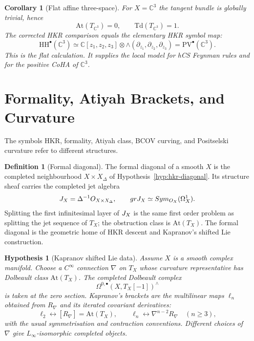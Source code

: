 \documentclass[11pt]{amsart}
\newtheorem{corollary}[theorem]{Corollary}
\newtheorem{hypothesis}[theorem]{Hypothesis}
\theoremstyle{definition}
\newtheorem{definition}[theorem]{Definition}
\theoremstyle{remark}
\providecommand{\At}{\mathrm{At}}
\providecommand{\HH}{\mathrm{HH}}
\providecommand{\PV}{\mathrm{PV}}
\providecommand{\Sym}{\mathrm{Sym}}
\providecommand{\Td}{\mathrm{Td}}
\providecommand{\cO}{\mathcal O}
\providecommand{\C}{\mathbb C}
\begin{document}
\begin{corollary}[Flat affine three-space]
\label{cor:c3-hkr}
For $X=\C^3$ the tangent bundle is globally trivial, hence
\[
  \At(T_{\C^3})=0,\qquad \Td(T_{\C^3})=1.
\]
The corrected HKR comparison equals the elementary HKR symbol map:
\[
  \HH^\bullet(\C^3)\simeq
  \C[z_1,z_2,z_3]\otimes
  \wedge(\partial_{z_1},\partial_{z_2},\partial_{z_3})
  =\PV^\bullet(\C^3).
\]
This is the flat calculation. It supplies the local model for hCS
Feynman rules and for the positive CoHA of $\C^3$.
\end{corollary}

\section{Formality, Atiyah Brackets, and Curvature}
\label{sec:formality-curvature}

The symbols HKR, formality, Atiyah class, BCOV curving, and
Positselski curvature refer to different structures.

\begin{definition}[Formal diagonal]
\label{def:formal-diagonal}
The formal diagonal of a smooth $X$ is the completed neighbourhood
$\widehat{X\times X}_{\Delta}$ of
Hypothesis~\ref{hyp:hkr-diagonal}. Its structure sheaf carries the
completed jet algebra
\[
  \cJ_X=\Delta^{-1}\cO_{\widehat{X\times X}_{\Delta}},
  \qquad
  \operatorname{gr}\cJ_X\simeq \widehat{\Sym}_{\cO_X}(\Omega^1_X).
\]
Splitting the first infinitesimal layer of $J_X$ is the same first
order problem as splitting the jet sequence of $T_X$; the obstruction
class is $\At(T_X)$. The formal diagonal is the geometric home of HKR
descent and Kapranov's shifted Lie construction.
\end{definition}

\begin{hypothesis}[Kapranov shifted Lie data]
\label{hyp:kapranov-shifted-lie}
Assume $X$ is a smooth complex manifold. Choose a $C^\infty$
connection $\nabla$ on $T_X$ whose curvature representative has
Dolbeault class $\At(T_X)$. The completed Dolbeault complex
\[
  \Omega^{0,\bullet}(X,T_X[-1])^{\wedge}
\]
is taken at the zero section. Kapranov's brackets are the multilinear
maps $\ell_n$ obtained from $R_\nabla$ and its iterated covariant
derivatives:
\[
  \ell_2 \longleftrightarrow [R_\nabla]=\At(T_X),
  \qquad
  \ell_n \longleftrightarrow \nabla^{n-2}R_\nabla
  \quad (n\ge3),
\]
with the usual symmetrisation and contraction conventions. Different
choices of $\nabla$ give $L_\infty$-isomorphic completed objects.
\end{hypothesis}
\end{document}
